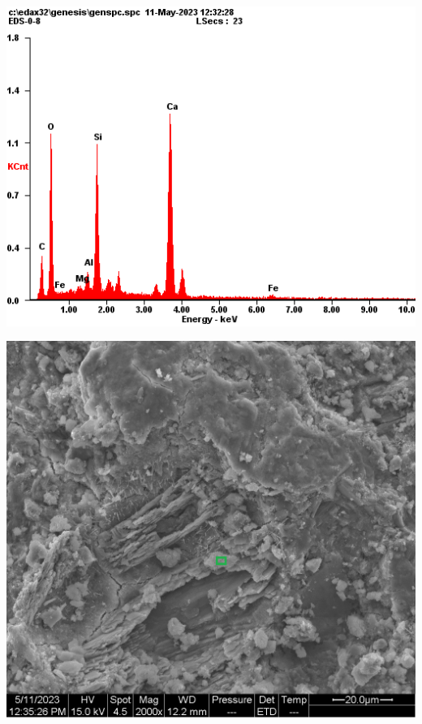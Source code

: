 \begin{minipage}{\textwidth}
  \begin{minipage}[b]{0.32\textwidth}
    \centering
    \includegraphics[width = \linewidth]{assets/spectrum/00-08-10000x-ETD-CSH.png}
  \end{minipage}
  \hfill
  \begin{minipage}[b]{0.32\textwidth}
    \centering
    \includegraphics[width = \linewidth]{assets/spectrum selection/00-08-02000x-ETD-CSH.png}

\end{minipage}
\end{minipage}
